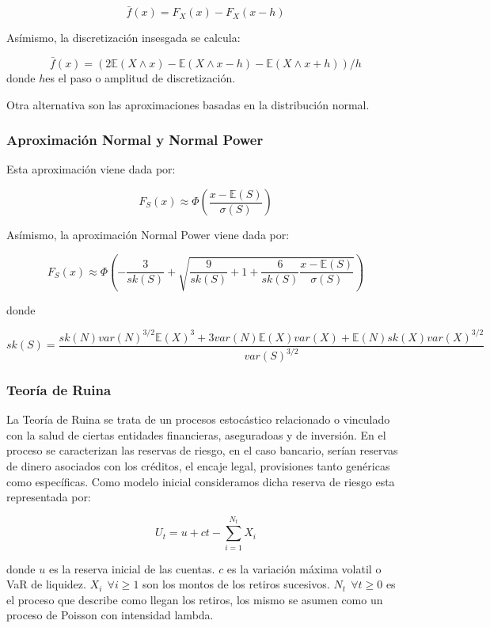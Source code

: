 \documentclass[]{article}
\begin{document}
\[\bar{f}(x)=F_X(x)-F_X(x-h)\]

Asímismo, la discretización insesgada se calcula:

\[\bar{f}(x)=(2\mathbb{E}(X\wedge x)-\mathbb{E}(X\wedge x-h)-\mathbb{E}(X \wedge x+h))/h\]
donde \(h\)es el paso o amplitud de discretización.

Otra alternativa son las aproximaciones basadas en la distribución
normal.

\hypertarget{aproximacion-normal-y-normal-power}{%
\subsubsection{Aproximación Normal y Normal
Power}\label{aproximacion-normal-y-normal-power}}

Esta aproximación viene dada por:

\[F_S(x) \approx \Phi\left(\frac{x-\mathbb{E}(S)}{\sigma(S)}\right)\]

Asímismo, la aproximación Normal Power viene dada por:

\[F_S(x) \approx \Phi\left(-\frac{3}{sk(S)}+\sqrt{\frac{9}{sk(S)}+1+\frac{6}{sk(S)}\frac{x-\mathbb{E}(S)}{\sigma(S)}}\right)\]

donde

\[sk(S)=\frac{sk(N)var(N)^{3/2}\mathbb{E}(X)^3+3var(N)\mathbb{E}(X)var(X)+ \mathbb{E}(N)sk(X)var(X)^{3/2}}{var(S)^{3/2}}\]

\hypertarget{teoria-de-ruina}{%
\subsubsection{Teoría de Ruina}\label{teoria-de-ruina}}

La Teoría de Ruina se trata de un procesos estocástico relacionado o
vinculado con la salud de ciertas entidades financieras, aseguradoas y
de inversión. En el proceso se caracterizan las reservas de riesgo, en
el caso bancario, serían reservas de dinero asociados con los créditos,
el encaje legal, provisiones tanto genéricas como específicas. Como
modelo inicial consideramos dicha reserva de riesgo esta representada
por:

\[U_t=u+ct-\sum_{i=1}^{N_t}X_i\]

donde \(u\) es la reserva inicial de las cuentas. \(c\) es la variación
máxima volatil o VaR de liquidez. \(X_i~~\forall i \geq1\) son los
montos de los retiros sucesivos. \(N_t~~\forall t \geq0\) es el proceso
que describe como llegan los retiros, los mismo se asumen como un
proceso de Poisson con intensidad lambda.
\end{document}
